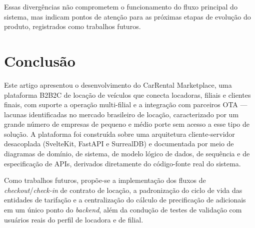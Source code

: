 \documentclass[conference,a4paper]{IEEEtran}
\begin{document}
Essas divergências não comprometem o funcionamento do fluxo principal do sistema, mas indicam pontos de atenção para as próximas etapas de evolução do produto, registrados como trabalhos futuros.

\section{Conclusão}

Este artigo apresentou o desenvolvimento do CarRental Marketplace, uma plataforma B2B2C de locação de veículos que conecta locadoras, filiais e clientes finais, com suporte a operação multi-filial e a integração com parceiros OTA --- lacunas identificadas no mercado brasileiro de locação, caracterizado por um grande número de empresas de pequeno e médio porte sem acesso a esse tipo de solução. A plataforma foi construída sobre uma arquitetura cliente-servidor desacoplada (SvelteKit, FastAPI e SurrealDB) e documentada por meio de diagramas de domínio, de sistema, de modelo lógico de dados, de sequência e de especificação de APIs, derivados diretamente do código-fonte real do sistema.

Como trabalhos futuros, propõe-se a implementação dos fluxos de \textit{checkout}/\textit{check-in} de contrato de locação, a padronização do ciclo de vida das entidades de tarifação e a centralização do cálculo de precificação de adicionais em um único ponto do \textit{backend}, além da condução de testes de validação com usuários reais do perfil de locadora e de filial.
\end{document}

